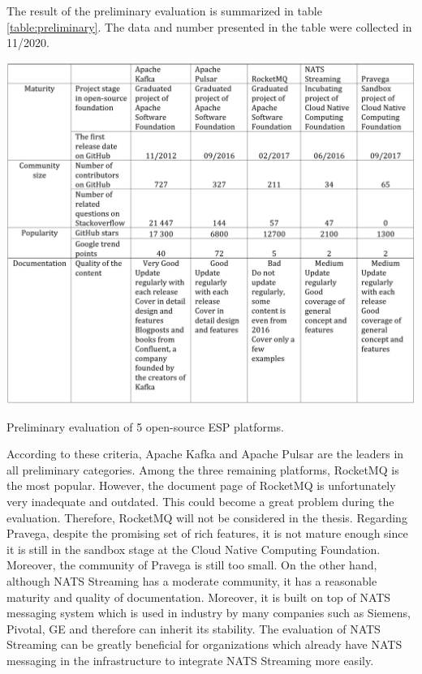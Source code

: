 The result of the preliminary evaluation is summarized in table \ref{table:preliminary}. The data and number presented in the table were collected in 11/2020.

\begin{table}[h]
	\includegraphics[width=\linewidth]{images/preliminary}
	\caption{Preliminary evaluation of 5 open-source ESP platforms.}
	\label{table:preliminary}
\end{table}

According to these criteria, Apache Kafka and Apache Pulsar are the leaders in all preliminary categories. Among the three remaining platforms, RocketMQ is the most popular. However, the document page of RocketMQ is unfortunately very inadequate and outdated. This could become a great problem during the evaluation.  Therefore, RocketMQ will not be considered in the thesis. Regarding Pravega, despite the promising set of rich features, it is not mature enough since it is still in the sandbox stage at the Cloud Native Computing Foundation. Moreover, the community of Pravega is still too small. On the other hand, although NATS Streaming has a moderate community, it has a reasonable maturity and quality of documentation. Moreover, it is built on top of NATS messaging system which is used in industry by many companies such as Siemens, Pivotal, GE and therefore can inherit its stability. The evaluation of NATS Streaming can be greatly beneficial for organizations which already have NATS messaging in the infrastructure to integrate NATS Streaming more easily.

